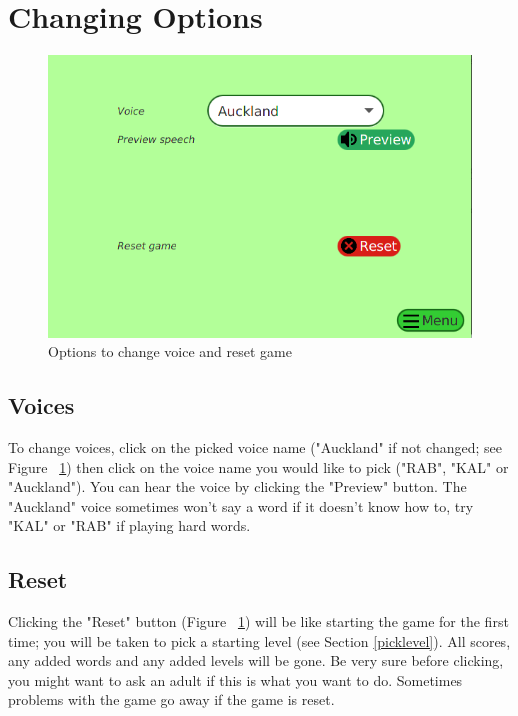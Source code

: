 \documentclass[12pt,a4paper,titlepage,onecolumn]{article}
\begin{document}
	\section{Changing Options}
	\begin{figure}[h]
		\centering
		\includegraphics[width=1\linewidth]{Figures/Options/OptionsGeneral}
		\caption[Options Menu]{Options to change voice and reset game}
		\label{fig:OptionsGeneral}
	\end{figure}
	\subsection{Voices}
	To change voices, click on the picked voice name ("Auckland" if not changed; see Figure ~\ref{fig:OptionsGeneral}) then click on the voice name you would like to pick ("RAB", "KAL" or "Auckland"). You can hear the voice by clicking the "Preview" button. The "Auckland" voice sometimes won't say a word if it doesn't know how to, try "KAL" or "RAB" if playing hard words.
	\subsection{Reset}
	Clicking the "Reset" button (Figure ~\ref{fig:OptionsGeneral}) will be like starting the game for the first time; you will be taken to pick a starting level (see Section \ref{picklevel}). All scores, any added words and any added levels will be gone. Be very sure before clicking, you might want to ask an adult if this is what you want to do. Sometimes problems with the game go away if the game is reset.
	
\end{document}
